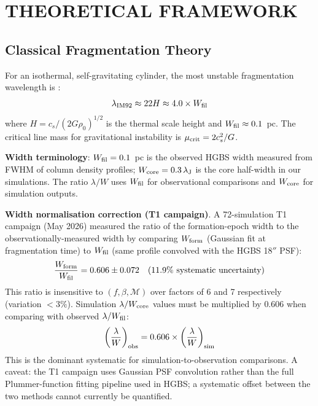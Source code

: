 \documentclass[twoside,twocolumn]{mnras}
\begin{document}
\section{THEORETICAL FRAMEWORK}

\subsection{Classical Fragmentation Theory}

For an isothermal, self-gravitating cylinder, the most unstable fragmentation wavelength
is \citep{Inutsuka1992}:
\begin{equation}
\lambda_{\rm IM92} \approx 22 H \approx 4.0 \times W_{\rm fil}
\label{eq:im92}
\end{equation}
where $H = c_s/(2G\rho_0)^{1/2}$ is the thermal scale height and $W_{\rm fil} \approx 0.1$~pc.
The critical line mass for gravitational instability is $\mu_{\rm crit} = 2c_s^2/G$.

\textbf{Width terminology}: $W_{\rm fil} = 0.1$~pc is the observed HGBS width measured
from FWHM of column density profiles; $W_{\rm core} = 0.3\,\lambda_{\rm J}$ is the
core half-width in our simulations. The ratio $\lambda/W$ uses $W_{\rm fil}$ for
observational comparisons and $W_{\rm core}$ for simulation outputs.

\textbf{Width normalisation correction (T1 campaign)}.
\label{sec:width_correction}
A 72-simulation T1 campaign (May 2026) measured the ratio of the formation-epoch width
to the observationally-measured width by comparing $W_{\rm form}$ (Gaussian fit at
fragmentation time) to $W_{\rm fil}$ (same profile convolved with the HGBS 18$''$ PSF):
\begin{equation}
\frac{W_{\rm form}}{W_{\rm fil}} = 0.606 \pm 0.072 \quad (11.9\% \text{ systematic uncertainty})
\label{eq:t1_correction}
\end{equation}
This ratio is insensitive to $(f, \beta, \mathcal{M})$ over factors of 6 and 7
respectively (variation $<3\%$). Simulation $\lambda/W_{\rm core}$ values must be
multiplied by 0.606 when comparing with observed $\lambda/W_{\rm fil}$:
\begin{equation}
\left(\frac{\lambda}{W}\right)_{\rm obs} = 0.606 \times \left(\frac{\lambda}{W}\right)_{\rm sim}
\label{eq:t1_apply}
\end{equation}
This is the dominant systematic for simulation-to-observation comparisons. A caveat: the
T1 campaign uses Gaussian PSF convolution rather than the full Plummer-function fitting
pipeline used in HGBS; a systematic offset between the two methods cannot currently be
quantified.
\end{document}
